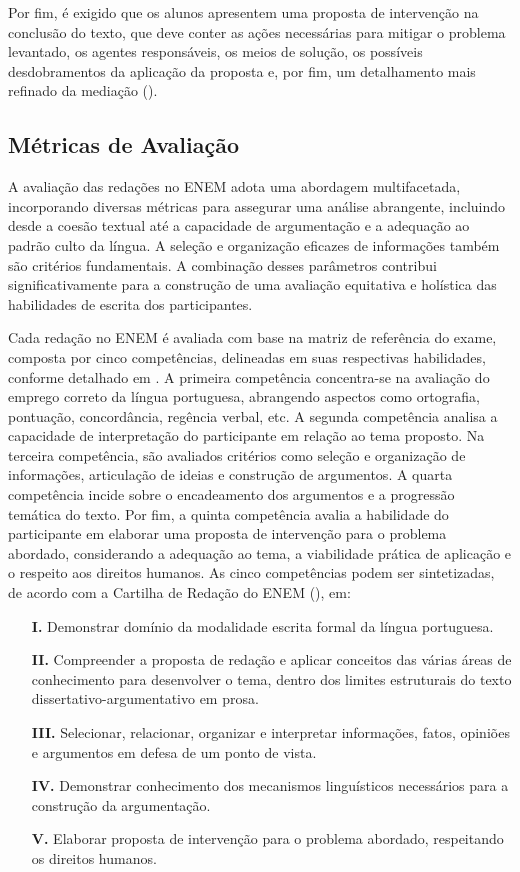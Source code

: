 Por fim, é exigido que os alunos apresentem uma proposta de intervenção na conclusão do texto, que deve conter as ações necessárias para mitigar o problema levantado, os agentes responsáveis, os meios de solução, os possíveis desdobramentos da aplicação da proposta e, por fim, um detalhamento mais refinado da mediação (\cite[p.~20]{cartilha-redacao}).

\subsection{Métricas de Avaliação}

A avaliação das redações no ENEM adota uma abordagem multifacetada, incorporando diversas métricas para assegurar uma análise abrangente, incluindo desde a coesão textual até a capacidade de argumentação e a adequação ao padrão culto da língua. A seleção e organização eficazes de informações também são critérios fundamentais. A combinação desses parâmetros contribui significativamente para a construção de uma avaliação equitativa e holística das habilidades de escrita dos participantes.

Cada redação no ENEM é avaliada com base na matriz de referência do exame, composta por cinco competências, delineadas em suas respectivas habilidades, conforme detalhado em \cite{cartilha-redacao}. A primeira competência concentra-se na avaliação do emprego correto da língua portuguesa, abrangendo aspectos como ortografia, pontuação, concordância, regência verbal, etc. A segunda competência analisa a capacidade de interpretação do participante em relação ao tema proposto. Na terceira competência, são avaliados critérios como seleção e organização de informações, articulação de ideias e construção de argumentos. A quarta competência incide sobre o encadeamento dos argumentos e a progressão temática do texto. Por fim, a quinta competência avalia a habilidade do participante em elaborar uma proposta de intervenção para o problema abordado, considerando a adequação ao tema, a viabilidade prática de aplicação e o respeito aos direitos humanos. As cinco competências podem ser sintetizadas, de acordo com a Cartilha de Redação do ENEM (\cite{cartilha-redacao}), em:

\begin{enumerate}
    \item[\textbf{I.}] Demonstrar domínio da modalidade escrita formal da língua portuguesa.
    \item[\textbf{II.}] Compreender a proposta de redação e aplicar conceitos das várias áreas de conhecimento para desenvolver o tema, dentro dos limites estruturais do texto dissertativo-argumentativo em prosa.
    \item[\textbf{III.}] Selecionar, relacionar, organizar e interpretar informações, fatos, opiniões e argumentos em defesa de um ponto de vista.
    \item[\textbf{IV.}] Demonstrar conhecimento dos mecanismos linguísticos necessários para a construção da argumentação.
    \item[\textbf{V.}] Elaborar proposta de intervenção para o problema abordado, respeitando os direitos humanos.
\end{enumerate}

